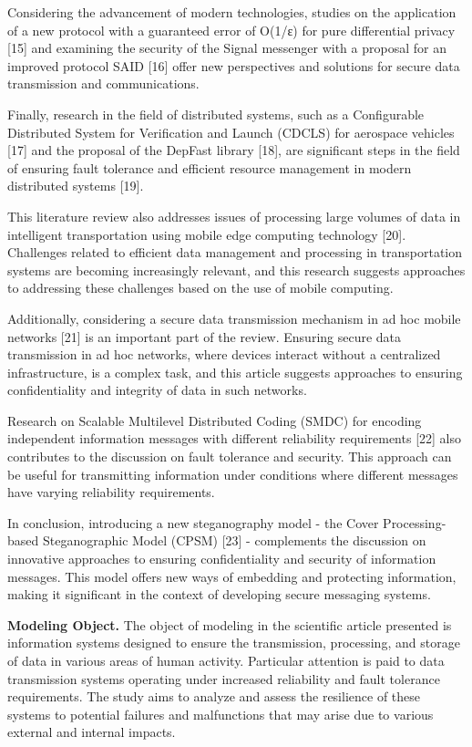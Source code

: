 Considering the advancement of modern technologies, studies on the
application of a new protocol with a guaranteed error of O(1/ε) for pure
differential privacy {[}15{]} and examining the security of the Signal
messenger with a proposal for an improved protocol SAID {[}16{]} offer
new perspectives and solutions for secure data transmission and
communications.

Finally, research in the field of distributed systems, such as a
Configurable Distributed System for Verification and Launch (CDCLS) for
aerospace vehicles {[}17{]} and the proposal of the DepFast library
{[}18{]}, are significant steps in the field of ensuring fault tolerance
and efficient resource management in modern distributed systems
{[}19{]}.

This literature review also addresses issues of processing large volumes
of data in intelligent transportation using mobile edge computing
technology {[}20{]}. Challenges related to efficient data management and
processing in transportation systems are becoming increasingly relevant,
and this research suggests approaches to addressing these challenges
based on the use of mobile computing.

Additionally, considering a secure data transmission mechanism in ad hoc
mobile networks {[}21{]} is an important part of the review. Ensuring
secure data transmission in ad hoc networks, where devices interact
without a centralized infrastructure, is a complex task, and this
article suggests approaches to ensuring confidentiality and integrity of
data in such networks.

Research on Scalable Multilevel Distributed Coding (SMDC) for encoding
independent information messages with different reliability requirements
{[}22{]} also contributes to the discussion on fault tolerance and
security. This approach can be useful for transmitting information under
conditions where different messages have varying reliability
requirements.

In conclusion, introducing a new steganography model - the Cover
Processing-based Steganographic Model (CPSM) {[}23{]} - complements the
discussion on innovative approaches to ensuring confidentiality and
security of information messages. This model offers new ways of
embedding and protecting information, making it significant in the
context of developing secure messaging systems.

\textbf{Modeling Object.} The object of modeling in the scientific
article presented is information systems designed to ensure the
transmission, processing, and storage of data in various areas of human
activity. Particular attention is paid to data transmission systems
operating under increased reliability and fault tolerance requirements.
The study aims to analyze and assess the resilience of these systems to
potential failures and malfunctions that may arise due to various
external and internal impacts.

